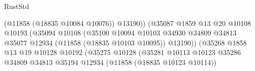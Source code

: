 \begin{lexlean}{RustStd}
\begin{coremodule}
                                                              (@11858 (@18835 @10084 @10076))
                                                              @13190))
                                                          (@35087
                                                            @1859
                                                            @13
                                                            @20
                                                            @10108
                                                            @10193
                                                            (@35094
                                                              @10108
                                                              (@35100
                                                                @10094
                                                                @10103
                                                                @34930
                                                                @34809
                                                                @34813
                                                                @35077
                                                                @12934
                                                                (@11858 (@18835 @10103 @10095))
                                                                @13190))
                                                            (@35268
                                                              @1858
                                                              @13
                                                              @19
                                                              @10128
                                                              @10192
                                                              (@35275
                                                                @10128
                                                                (@35281
                                                                  @10113
                                                                  @10123
                                                                  @35286
                                                                  @34809
                                                                  @34813
                                                                  @35194
                                                                  @12934
                                                                  (@11858 (@18835 @10123 @10114))

\end{coremodule}
\end{lexlean}
